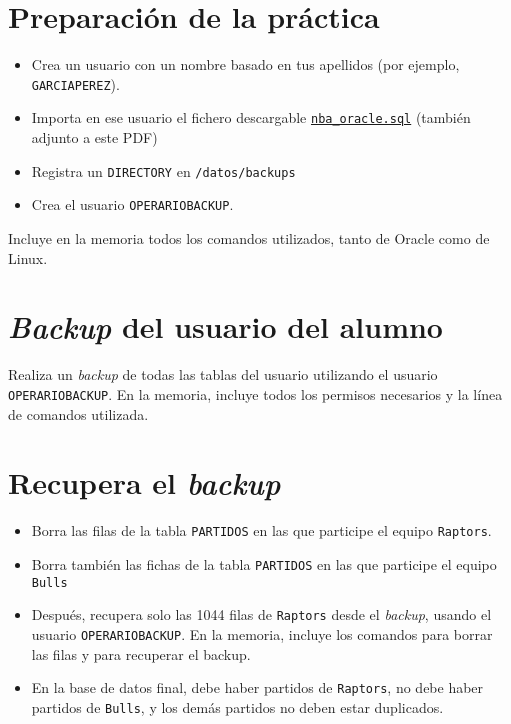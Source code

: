 \documentclass[a4paper]{article}
\begin{document}
\section*{Preparación de la práctica}
\label{sec:org0000003}
\begin{itemize}
\item Crea un usuario con un nombre basado en tus apellidos (por ejemplo, \texttt{GARCIAPEREZ}).
\item Importa en ese usuario el fichero descargable \href{https://alvarogonzalezsotillo.github.io/apuntes-clase/gestion-bd-asir1/ejemplosSQL/nba\_oracle.sql}{\texttt{nba\_oracle.sql}} (también adjunto a este PDF)
\item Registra un \texttt{DIRECTORY} en \texttt{/datos/backups}
\item Crea el usuario \texttt{OPERARIOBACKUP}.
\end{itemize}

Incluye en la memoria todos los comandos utilizados, tanto de Oracle como de Linux.

\section*{\emph{Backup} del usuario del alumno}
\label{sec:org0000006}
Realiza un \emph{backup} de todas las tablas del usuario utilizando el usuario \texttt{OPERARIOBACKUP}. En la memoria, incluye todos los permisos necesarios y la línea de comandos utilizada.

\section*{Recupera el \emph{backup}}
\label{sec:org0000009}
\begin{itemize}
\item Borra las filas de la tabla \texttt{PARTIDOS} en las que participe el equipo \texttt{Raptors}.
\item Borra también las fichas de la tabla \texttt{PARTIDOS} en las que participe el equipo \texttt{Bulls}
\item Después, recupera solo las 1044 filas de \texttt{Raptors} desde el \emph{backup}, usando el usuario \texttt{OPERARIOBACKUP}. En la memoria, incluye los comandos para borrar las filas y para recuperar el backup.
\item En la base de datos final, debe haber partidos de \texttt{Raptors}, no debe haber partidos de \texttt{Bulls}, y los demás partidos no deben estar duplicados.
\end{itemize}
\end{document}
